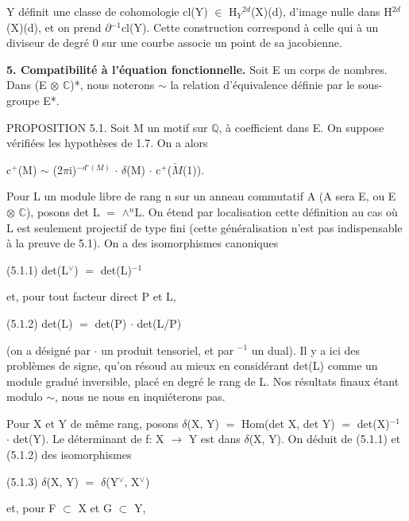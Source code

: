 \documentclass[10pt,twoside]{article}
\newcommand{\SectionLead}[1]{\textbf{\color{D030Accent}#1}}
\begin{document}
Y définit une classe de cohomologie cl(Y) \ensuremath{∈} H\ensuremath{_{Y}}\ensuremath{^{2d}}(X)(d), d’image nulle dans H\ensuremath{^{2d}}(X)(d), et on prend \ensuremath{∂}\ensuremath{^{-1}}cl(Y). Cette construction correspond à celle qui à un diviseur de degré 0 sur une courbe associe un point de sa jacobienne.\par
\SectionLead{5. Compatibilité à l’équation fonctionnelle.} Soit E un corps de nombres. Dans (E \ensuremath{⊗} \ensuremath{ℂ})*, nous noterons \ensuremath{∼} la relation d’équivalence définie par le sous-groupe E*.\par
PROPOSITION 5.1. Soit M un motif sur \ensuremath{ℚ}, à coefficient dans E. On suppose vérifiées les hypothèses de 1.7. On a alors\par
c\ensuremath{^{+}}(M) \ensuremath{∼} (2\ensuremath{π}i)\ensuremath{^{−d⁻(M)}} \ensuremath{·} \ensuremath{δ}(M) \ensuremath{·} c\ensuremath{^{+}}(\ensuremath{\check{M}}(1)).\par
Pour L un module libre de rang n sur un anneau commutatif A (A sera E, ou E \ensuremath{⊗} \ensuremath{ℂ}), posons det L \ensuremath{=} \ensuremath{∧}\ensuremath{^{n}}L. On étend par localisation cette définition au cas où L est seulement projectif de type fini (cette généralisation n’est pas indispensable à la preuve de 5.1). On a des isomorphismes canoniques\par
(5.1.1)    det(L\ensuremath{^{∨}}) \ensuremath{=} det(L)\ensuremath{^{-1}}\par
et, pour tout facteur direct P et L,\par
(5.1.2)    det(L) \ensuremath{=} det(P) \ensuremath{·} det(L/P)\par
(on a désigné par \ensuremath{·} un produit tensoriel, et par \ensuremath{^{-1}} un dual). Il y a ici des problèmes de signe, qu’on résoud au mieux en considérant det(L) comme un module gradué inversible, placé en degré le rang de L. Nos résultats finaux étant modulo \ensuremath{∼}, nous ne nous en inquiéterons pas.\par
Pour X et Y de même rang, posons \ensuremath{δ}(X, Y) \ensuremath{=} Hom(det X, det Y) \ensuremath{=} det(X)\ensuremath{^{-1}} \ensuremath{·} det(Y). Le déterminant de f: X \ensuremath{→} Y est dans \ensuremath{δ}(X, Y). On déduit de (5.1.1) et (5.1.2) des isomorphismes\par
(5.1.3)    \ensuremath{δ}(X, Y) \ensuremath{=} \ensuremath{δ}(Y\ensuremath{^{∨}}, X\ensuremath{^{∨}})\par
et, pour F \ensuremath{⊂} X et G \ensuremath{⊂} Y,\par
\end{document}
